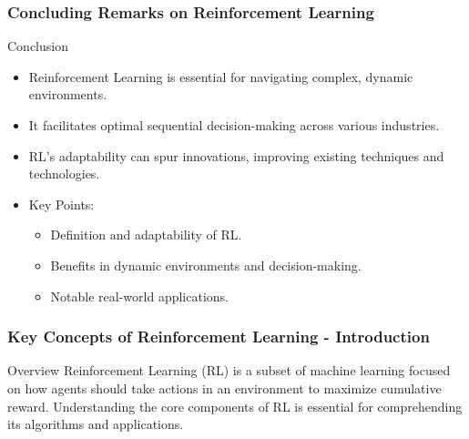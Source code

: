 \documentclass[aspectratio=169]{beamer}
\begin{document}
\begin{frame}[fragile]
    \frametitle{Concluding Remarks on Reinforcement Learning}
    \begin{block}{Conclusion}
        \begin{itemize}
            \item Reinforcement Learning is essential for navigating complex, dynamic environments.
            \item It facilitates optimal sequential decision-making across various industries.
            \item RL's adaptability can spur innovations, improving existing techniques and technologies.
        \end{itemize}
    \end{block}
    \begin{itemize}
        \item Key Points:
            \begin{itemize}
                \item Definition and adaptability of RL.
                \item Benefits in dynamic environments and decision-making.
                \item Notable real-world applications.
            \end{itemize}
    \end{itemize}
\end{frame}

\begin{frame}[fragile]
    \frametitle{Key Concepts of Reinforcement Learning - Introduction}
    \begin{block}{Overview}
        Reinforcement Learning (RL) is a subset of machine learning focused on how agents should take actions in an environment to maximize cumulative reward. Understanding the core components of RL is essential for comprehending its algorithms and applications.
    \end{block}
\end{frame}
\end{document}

